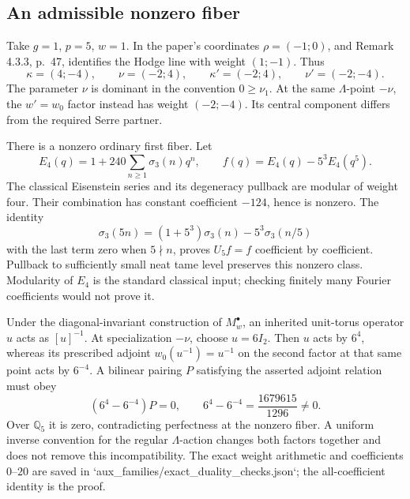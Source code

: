 \documentclass[10pt]{article}
\begin{document}
\subsection*{An admissible nonzero fiber}
Take \(g=1\), \(p=5\), \(w=1\). In the paper’s coordinates \(\rho=(-1;0)\), and Remark 4.3.3, p. 47, identifies the Hodge line with weight \((1;-1)\). Thus \[\kappa=(4;-4),\qquad \nu=(-2;4),\qquad
 \kappa'=(-2;4),\qquad \nu'=(-2;-4).\] The parameter \(\nu\) is dominant in the convention \(0\geq\nu_1\). At the same \(\Lambda\)-point \(-\nu\), the \(w'=w_0\) factor instead has weight \((-2;-4)\). Its central component differs from the required Serre partner.\par
There is a nonzero ordinary first fiber. Let \[E_4(q)=1+240\sum_{n\geq1}\sigma_3(n)q^n,\qquad
 f(q)=E_4(q)-5^3E_4(q^5).\] The classical Eisenstein series and its degeneracy pullback are modular of weight four. Their combination has constant coefficient \(-124\), hence is nonzero. The identity \[\sigma_3(5n)=(1+5^3)\sigma_3(n)-5^3\sigma_3(n/5)\] with the last term zero when \(5\nmid n\), proves \(U_5f=f\) coefficient by coefficient. Pullback to sufficiently small neat tame level preserves this nonzero class. Modularity of \(E_4\) is the standard classical input; checking finitely many Fourier coefficients would not prove it.\par
Under the diagonal-invariant construction of \(M_w^\bullet\), an inherited unit-torus operator \(u\) acts as \([u]^{-1}\). At specialization \(-\nu\), choose \(u=6I_2\). Then \(u\) acts by \(6^4\), whereas its prescribed adjoint \(w_0(u^{-1})=u^{-1}\) on the second factor at that same point acts by \(6^{-4}\). A bilinear pairing \(P\) satisfying the asserted adjoint relation must obey \[(6^4-6^{-4})P=0,\qquad
 6^4-6^{-4}=\frac{1679615}{1296}\ne0.\] Over \(\mathbb Q_5\) it is zero, contradicting perfectness at the nonzero fiber. A uniform inverse convention for the regular \(\Lambda\)-action changes both factors together and does not remove this incompatibility. The exact weight arithmetic and coefficients \(0\)–\(20\) are saved in `aux\_families/exact\_duality\_checks.json`; the all-coefficient identity is the proof.\par
\end{document}
